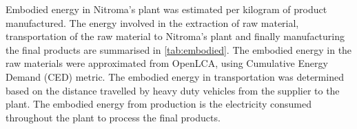 Embodied energy in Nitroma's plant was estimated per kilogram of product manufactured. The energy involved in the extraction of raw material, transportation of the raw material to Nitroma's plant and finally manufacturing the final products are summarised in \cref{tab:embodied}. The embodied energy in the raw materials were approximated from OpenLCA, using Cumulative Energy Demand (CED) metric. The embodied energy in transportation was determined based on the distance travelled by heavy duty vehicles from the supplier to the plant. The embodied energy from production is the electricity consumed throughout the plant to process the final products. 



